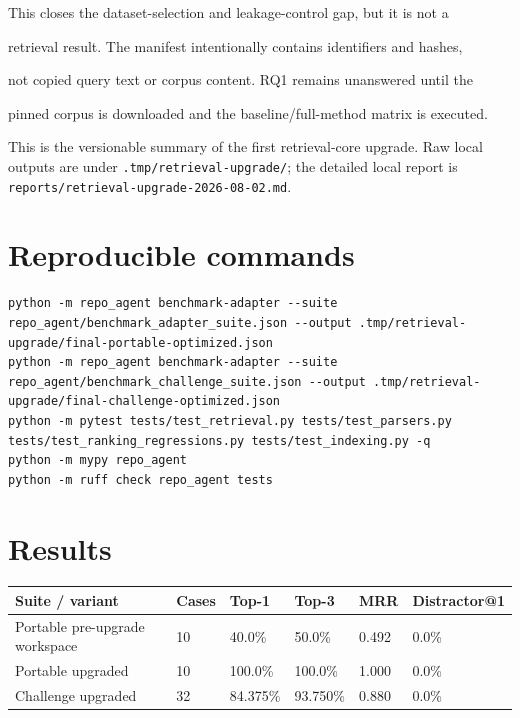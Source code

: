 \documentclass[UTF8,12pt,openany]{ctexbook}
\begin{document}
This closes the dataset-selection and leakage-control gap, but it is not a\par
retrieval result. The manifest intentionally contains identifiers and hashes,\par
not copied query text or corpus content. RQ1 remains unanswered until the\par
pinned corpus is downloaded and the baseline/full-method matrix is executed.\par

This is the versionable summary of the first retrieval-core upgrade. Raw local outputs are under \texttt{.tmp/retrieval-upgrade/}; the detailed local report is \texttt{reports/retrieval-upgrade-2026-08-02.md}.\par

\section{Reproducible commands}

\begin{lstlisting}
python -m repo_agent benchmark-adapter --suite repo_agent/benchmark_adapter_suite.json --output .tmp/retrieval-upgrade/final-portable-optimized.json
python -m repo_agent benchmark-adapter --suite repo_agent/benchmark_challenge_suite.json --output .tmp/retrieval-upgrade/final-challenge-optimized.json
python -m pytest tests/test_retrieval.py tests/test_parsers.py tests/test_ranking_regressions.py tests/test_indexing.py -q
python -m mypy repo_agent
python -m ruff check repo_agent tests
\end{lstlisting}

\section{Results}

\begin{center}
\small
\begin{longtable}{|p{}|p{}|p{}|p{}|p{}|p{}|}
\toprule
Suite / variant & Cases & Top-1 & Top-3 & MRR & Distractor@1 \\
\midrule
Portable pre-upgrade workspace & 10 & 40.0\% & 50.0\% & 0.492 & 0.0\% \\
Portable upgraded & 10 & 100.0\% & 100.0\% & 1.000 & 0.0\% \\
Challenge upgraded & 32 & 84.375\% & 93.750\% & 0.880 & 0.0\% \\
\bottomrule
\end{longtable}
\end{center}
\end{document}
